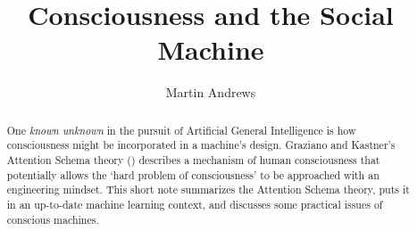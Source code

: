 \documentclass[citeauthoryear]{llncs}
\begin{document}
%
\frontmatter          %
%
\pagestyle{headings}  %
%
\mainmatter              %
%
\title{Consciousness and the Social Machine}
%
%
\author{Martin Andrews}
%
%
%

\maketitle              %

\begin{abstract}

One \emph{known unknown} in the pursuit of Artificial General Intelligence 
is how consciousness might be incorporated in a machine's design.  
%
Graziano and Kastner's Attention Schema theory (\cite{GrazianoKastner})
describes a mechanism of human consciousness 
that potentially allows the `hard problem of consciousness'
to be approached with an engineering mindset.
%
This short note summarizes the Attention Schema theory, 
puts it in an up-to-date machine learning context, 
and discusses some practical issues of conscious machines.

\end{abstract}
%

%
%
%
\end{document}
